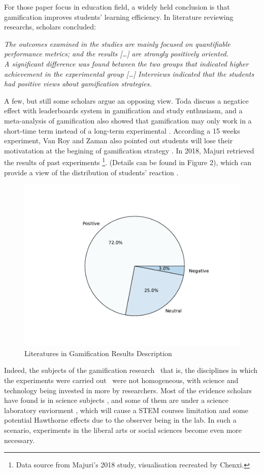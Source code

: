 \documentclass[12pt]{article} %
\begin{document}
\newpage
\noindent For those paper focus in education field, a widely held conclusion is that gamification improves students' learning efficiency. In literature reviewing researchs, scholars concluded:
\par
\noindent \textit{The outcomes examined in the studies are mainly focused on quantifiable performance metrics; and the results [\dots] are strongly positively oriented.
} 
\citep{majuri2018gamification}
\\
\noindent \textit{A significant difference was found between the two groups that indicated higher achievement in the experimental group [\dots] Interviews indicated that the students had positive views about gamification strategies.
}
\citep{turan2016gamification}
\par
\noindent A few, but still some scholars argue an opposing view. Toda discuss a negatice effect with leaderboards system in gamification and study enthusiasm\citep{toda2017dark}, and a meta-analysis of gamification also showed that gamification may only work in a short-time term instead of a long-term experimental \citep{kim2021effects}. According a 15 weeks experiment, Van Roy and Zaman also pointed out students will lose their motivatation at the begining of gamification strategy \citep{van2018need}. In 2018, Majuri retrieved the results of past experiments
\footnote[4]{
	Data source from Majuri's 2018 study, visualisation recreated by Chenxi.
}.
(Details can be found in Figure 2), which can provide a view of the distribution of students' reaction \citep{majuri2018gamification}.
\begin{figure}[h]
	\centering
	\caption{Literatures in Gamification Results Description}
	\includegraphics[width=.7\textwidth]
	{results_statistics.pdf}  
\end{figure}
\par 
\noindent Indeed, the subjects of the gamification research \textendash\ that is, the disciplines in which the experiments were carried out \textendash\ were not homogeneous, with science and technology being invested in more by researchers. Most of the evidence scholars have found is in science subjects \citep{kalogiannakis2021gamification}, and some of them are under a science laboratory enviorment \citep{fleischman2016gamification, drace2013gamification}, which will cause a STEM courses limitation \citep{rabah2018gamification} and some potential Hawthorne effects due to the observer being in the lab. In such a scenario, experiments in the liberal arts or social sciences become even more necessary.
\end{document}
